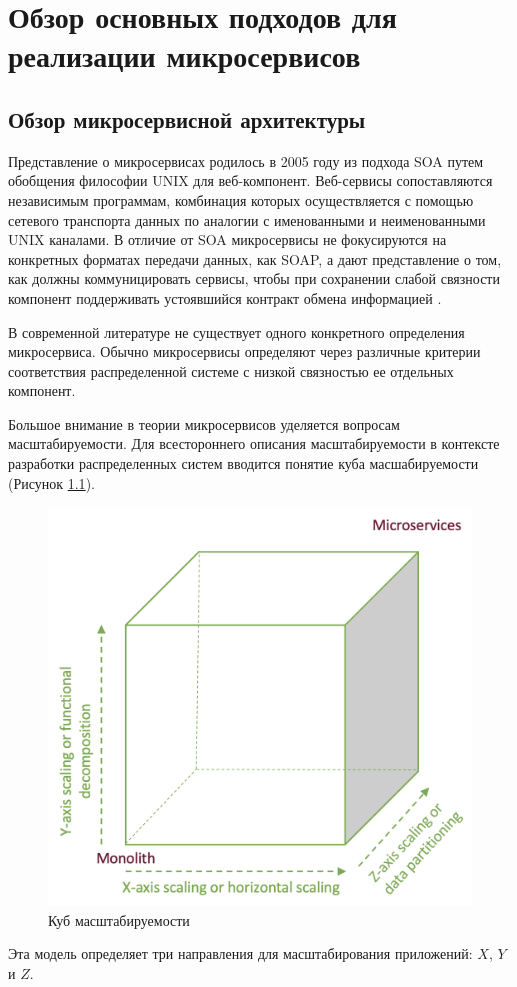 \chapter{Обзор основных подходов для реализации микросервисов}
\section{Обзор микросервисной архитектуры}

Представление о микросервисах родилось в 2005 году из подхода SOA путем обобщения философии UNIX для веб-компонент.
Веб-сервисы сопоставляются независимым программам, комбинация которых осуществляется с помощью сетевого транспорта данных по аналогии с именованными и неименованными UNIX каналами.
В отличие от SOA микросервисы не фокусируются на конкретных форматах передачи данных, как SOAP, 
а дают представление о том, как должны коммуницировать сервисы, чтобы при сохранении слабой связности компонент поддерживать устоявшийся контракт обмена информацией \cite{micro-1}.

В современной литературе не существует одного конкретного определения микросервиса. 
Обычно микросервисы определяют через различные критерии соответствия распределенной системе с низкой связностью ее отдельных компонент.

Большое внимание в теории микросервисов уделяется вопросам масштабируемости. 
Для всестороннего описания масштабируемости в контексте разработки распределенных систем вводится понятие куба масшабируемости \cite{scalability} (Рисунок \ref{fig:cube}).

\begin{figure}[H]
    \centering
    \includegraphics[width=0.5\linewidth]{img/cube.png}
    \caption{Куб масштабируемости}
    \label{fig:cube}
\end{figure}

Эта модель определяет три направления для масштабирования приложений: $X$, $Y$ и $Z$.

